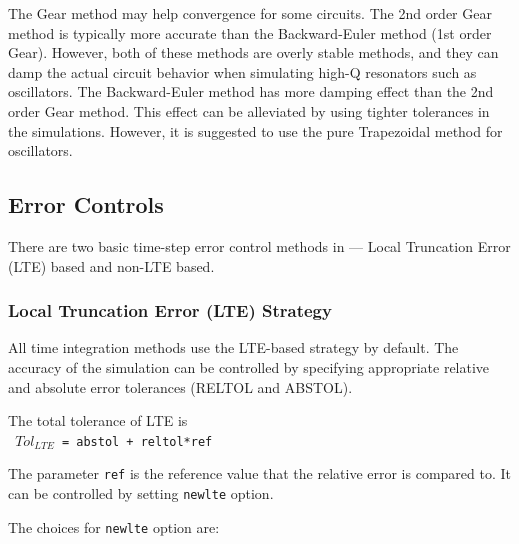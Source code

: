 The Gear method may help convergence for some circuits. The 2nd order
Gear method is typically more accurate than the Backward-Euler method
(1st order Gear). However, both of these methods are overly stable
methods, and they can damp the actual circuit behavior when simulating
high-Q resonators such as oscillators.  The Backward-Euler method has
more damping effect than the 2nd order Gear method.  This effect can
be alleviated by using tighter tolerances in the simulations. However,
it is suggested to use the pure Trapezoidal method for oscillators.

\subsection{Error Controls}
\label{Time_Step_Selection}
  

There are two basic time-step error control methods in \Xyce{} ---
Local Truncation Error (LTE) based and non-LTE based.


\subsubsection{Local Truncation Error (LTE) Strategy}
 

All time integration methods use the LTE-based strategy by
default. The accuracy of the simulation can be controlled by
specifying appropriate relative and absolute error tolerances (RELTOL
and ABSTOL).


The total tolerance of LTE is
{\\
\texttt{ $Tol_{LTE}$  = abstol +  reltol*ref}  
}

The parameter \verb|ref| is the reference value that the relative
error is compared to. It can be controlled by setting \verb|newlte|
option.


The  choices for \verb|newlte| option are:

